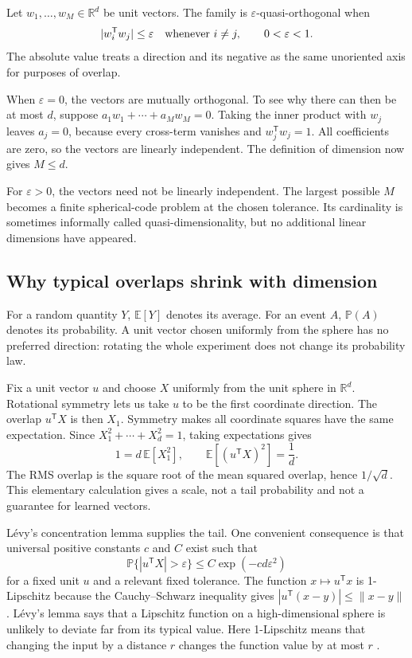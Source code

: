 \documentclass[
  aps,
  reprint,
  superscriptaddress,
  floatfix,
  nofootinbib,
  longbibliography
]{revtex4-2}
\newcommand{\R}{\mathbb{R}}
\newcommand{\E}{\mathbb{E}}
\newcommand{\Prob}{\mathbb{P}}
\newcommand{\T}{^{\mathsf T}}
\newcommand{\norm}[1]{\lVert #1\rVert}
\begin{document}
Let $w_1,\ldots,w_M\in\R^d$ be unit vectors.  The family is
$\varepsilon$-quasi-orthogonal when
\begin{equation}
 |w_i\T w_j|\leq\varepsilon
 \quad\hbox{whenever }i\ne j,
 \qquad 0<\varepsilon<1.
 \label{eq:quasi-app}
\end{equation}
The absolute value treats a direction and its negative as the same
unoriented axis for purposes of overlap.

When $\varepsilon=0$, the vectors are mutually orthogonal.  To see why there
can then be at most $d$, suppose
$a_1w_1+\cdots+a_Mw_M=0$.  Taking the inner product with $w_j$ leaves
$a_j=0$, because every cross-term vanishes and $w_j\T w_j=1$.  All
coefficients are zero, so the vectors are linearly independent.  The
definition of dimension now gives $M\leq d$.

For $\varepsilon>0$, the vectors need not be linearly independent.  The
largest possible $M$ becomes a finite spherical-code problem at the chosen
tolerance.  Its cardinality is sometimes informally called
quasi-dimensionality, but no additional linear dimensions have appeared.

\subsection{Why typical overlaps shrink with dimension}

For a random quantity $Y$, $\E[Y]$ denotes its average.  For an event $A$,
$\Prob(A)$ denotes its probability.  A unit vector chosen uniformly from the
sphere has no preferred direction: rotating the whole experiment does not
change its probability law.

Fix a unit vector $u$ and choose $X$ uniformly from the unit sphere in
$\R^d$.  Rotational symmetry lets us take $u$ to be the first coordinate
direction.  The overlap $u\T X$ is then $X_1$.  Symmetry makes all coordinate
squares have the same expectation.  Since
$X_1^2+\cdots+X_d^2=1$, taking expectations gives
\begin{equation}
 1=d\,\E[X_1^2],
 \qquad
 \E[(u\T X)^2]=\frac1d.
 \label{eq:rms-overlap-app}
\end{equation}
The RMS overlap is the square root of the mean squared overlap, hence
$1/\sqrt d$.  This elementary calculation gives a scale, not a tail
probability and not a guarantee for learned vectors.

L\'evy's concentration lemma supplies the tail.  One convenient consequence
is that universal positive constants $c$ and $C$ exist such that
\begin{equation}
 \Prob\{|u\T X|>\varepsilon\}
 \leq C\exp(-c d\varepsilon^2)
 \label{eq:levy-overlap-app}
\end{equation}
for a fixed unit $u$ and a relevant fixed tolerance.  The function
$x\mapsto u\T x$ is 1-Lipschitz because the Cauchy--Schwarz inequality gives
$|u\T(x-y)|\leq\norm{x-y}$.  L\'evy's lemma says that a Lipschitz function on
a high-dimensional sphere is unlikely to deviate far from its typical value.
Here 1-Lipschitz means that changing the input by a distance $r$ changes the
function value by at most $r$
\cite{ledoux2001concentration,milman1986asymptotic}.
\end{document}
